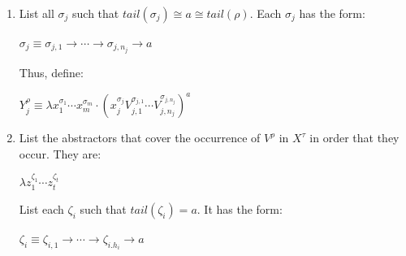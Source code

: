 \documentclass[a4paper,10pt]{article}
\begin{document}
\begin{mydef}
\begin{enumerate}
\begin{enumerate}
\begin{enumerate}
\begin{enumerate}
                                 \item List all $\sigma_j$ such that
                                   $tail(\sigma_j) \cong a \cong
                                   tail(\rho)$. Each $\sigma_j$ has
                                   the form:

                                   \begin{center}
                                         $\sigma_j \equiv \sigma_{j,1}
                                         \rightarrow \cdots
                                         \rightarrow \sigma_{j,n_j}
                                         \rightarrow a$
                                   \end{center}

                                   Thus, define:
                                   \begin{center}
                                         $Y^{\rho}_j \equiv \lambda
                                         x^{\sigma_1}_1 \cdots
                                         x^{\sigma_m}_m \cdot
                                         (x^{\sigma_j}_j
                                         V^{\sigma_{j,1}}_{j,1} \cdots
                                         V^{\sigma_{j,n_j}}_{j,n_j})^{a}$
                                   \end{center}

                                   \item List the abstractors that
                                     cover the occurrence of $V^{\rho}$
                                     in $X^{\tau}$ in order that they
                                     occur. They are:

                                     \begin{center}
                                            $\lambda z^{\zeta_1}_1 \cdots z^{\zeta_t}_t$
                                     \end{center}

                                     List each $\zeta_i$ such that
                                     $tail(\zeta_i) = a$. It has the
                                     form:

                                     \begin{center}
                                           $\zeta_i \equiv \zeta_{i,1}
                                           \rightarrow \cdots
                                           \rightarrow \zeta_{i.h_i}
                                           \rightarrow a$
                                     \end{center}


\end{enumerate}
\end{enumerate}
\end{enumerate}
\end{enumerate}
\end{mydef}
\end{document}
